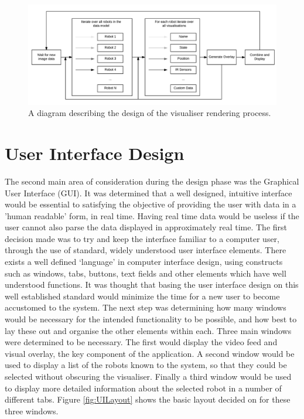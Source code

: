 \begin{figure}[h]
	\centering
	\includegraphics[scale=0.7]{Figures/VisualiserProcess.png}
	\decoRule
	\caption[Visualiser Render Process Design]{A diagram describing the design of the visualiser rendering process.}
	\label{fig:VisualiserProcess}
\end{figure}


\section{User Interface Design}
The second main area of consideration during the design phase was the Graphical User Interface (GUI). It was determined that a well designed, intuitive interface would be essential to satisfying the objective of providing the user with data in a 'human readable' form, in real time. Having real time data would be useless if the user cannot also parse the data displayed in approximately real time. The first decision made was to try and keep the interface familiar to a computer user, through the use of standard, widely understood user interface elements. There exists a well defined `language' in computer interface design, using constructs such as windows, tabs, buttons, text fields and other elements which have well understood functions. It was thought that basing the user interface design on this well established standard would minimize the time for a new user to become accustomed to the system. The next step was determining how many windows would be necessary for the intended functionality to be possible, and how best to lay these out and organise the other elements within each. Three main windows were determined to be necessary. The first would display the video feed and visual overlay, the key component of the application. A second window would be used to display a list of the robots known to the system, so that they could be selected without obscuring the visualiser. Finally a third window would be used to display more detailed information about the selected robot in a number of different tabs. Figure \ref{fig:UILayout} shows the basic layout decided on for these three windows.


